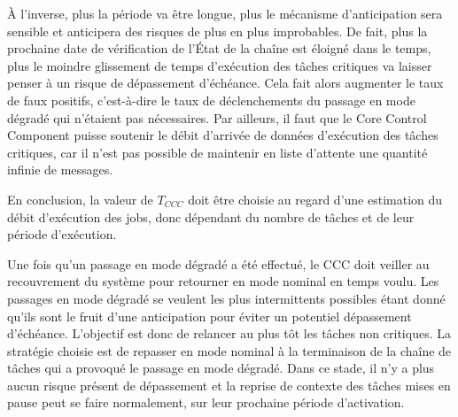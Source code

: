 \documentclass[french, a4paper, 11pt, twoside, pdftex]{StyleThese}
\begin{document}
        À l'inverse, plus la période va être longue, plus le mécanisme d'anticipation sera sensible et anticipera des risques de plus en plus improbables. De fait, plus la prochaine date de vérification de l'État de la chaîne est éloigné dans le temps, plus le moindre glissement de temps d'exécution des tâches critiques va laisser penser à un risque de dépassement d'échéance. Cela fait alors augmenter le taux de faux positifs, c'est-à-dire le taux de déclenchements du passage en mode dégradé qui n'étaient pas nécessaires. Par ailleurs, il faut que le Core Control Component puisse soutenir le débit d'arrivée de données d'exécution des tâches critiques, car il n'est pas possible de maintenir en liste d'attente une quantité infinie de messages.
        
        En conclusion, la valeur de $T_{CCC}$ doit être choisie au regard d'une estimation du débit d'exécution des jobs, donc dépendant du nombre de tâches et de leur période d'exécution. 
        
		Une fois qu'un passage en mode dégradé a été effectué, le CCC doit veiller au recouvrement du système pour retourner en mode nominal en temps voulu. Les passages en mode dégradé se veulent les plus intermittents possibles étant donné qu'ils sont le fruit d'une anticipation pour éviter un potentiel dépassement d'échéance. L'objectif est donc de relancer au plus tôt les tâches non critiques. La stratégie choisie est de repasser en mode nominal à la terminaison de la chaîne de tâches qui a provoqué le passage en mode dégradé. Dans ce stade, il n'y a plus aucun risque présent de dépassement et la reprise de contexte des tâches mises en pause peut se faire normalement, sur leur prochaine période d'activation. 
		
            
\end{document}
